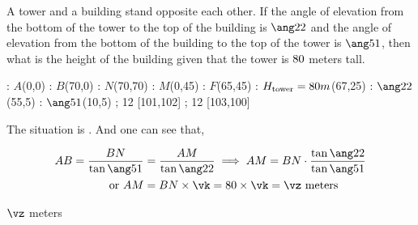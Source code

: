 

\DEGREESCOT\va\vc
\DEGREESCOT\vb\vd
\DEGREESTAN\va\vx
\DEGREESTAN\vb\vy

\MULTIPLY\vc\vy\vm %
\MULTIPLY\vd\vx\vn%

\ROUND[2]\vm\vj
\ROUND[2]\vn\vk
\MULTIPLY\vh\vk\vl
\ROUND[2]\vl\vz

\question[2] A tower and a building stand opposite each other. If the angle of elevation
from the bottom of the tower to the top of the building is $\ang\va$ and the angle
of elevation from the bottom of the building to the top of the tower is $\ang\vb$, then
what is the height of the building given that the tower is $80$ meters tall.

\watchout


\ifprintanswers
  \begin{marginfigure}
      : $A$(0,0)
      : $B$(70,0)
      : $N$(70,70)
      : $M$(0,45)
      : $F$(65,45)
      : $H_{\text{tower}} = 80 m$(67,25)
      : $\ang\va$(55,5)
      : $\ang\vb$(10,5)
    \figdrawbegin{}
      \figdrawline [100,101,102,100]
      \figdrawline [101,103,100]
       ; 12 [101,102] 
       ; 12 [103,100] 
    \figdrawend
    \centerline{\box\figBoxA}
  \end{marginfigure}
\fi 

\begin{solution}[\halfpage]
	The situation is \asif. And one can see that,
	
	\begin{align}
		AB = \dfrac{BN}{\tan\ang\vb} &= \dfrac{AM}{\tan\ang\va} \implies AM = BN\cdot\dfrac{\tan\ang\va}{\tan\ang\vb} \\
		\text{or } AM &= BN\times\vk = \vh\times\vk = \vz\text{ meters}
	\end{align}
\end{solution}

\ifprintanswers\begin{codex}$\vz$ meters\end{codex}\fi
